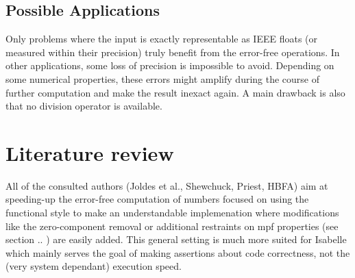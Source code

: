 \documentclass[11pt,a4paper]{article}
\begin{document}
\subsection{Possible Applications}
Only problems where the input is exactly representable as IEEE floats (or measured within their precision) truly benefit from the error-free
operations. In other applications, some loss of precision is impossible to avoid. Depending on some numerical properties, these errors might amplify during the course of further computation and make the result inexact again. A main drawback is also that no division operator is available.


\section{Literature review}

All of the consulted authors (Joldes et al., Shewchuck, Priest, HBFA) aim at speeding-up the error-free computation of numbers
focused on using the functional style to make an understandable implemenation where modifications like the zero-component removal or additional restraints on mpf properties (see section .. ) are easily added.
This general setting is much more suited for Isabelle which mainly serves the goal of making assertions about code correctness, not the (very system dependant) execution speed.


%
%
\end{document}
